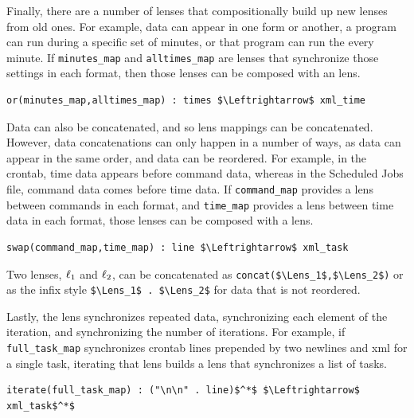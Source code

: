 \documentclass[acmsmall,screen,anonymous]{acmart}
\begin{document}
Finally, there are a number of lenses that compositionally build up new lenses
from old ones. For example, data can appear in one form or another, a program
can run during a specific set of minutes, or that program can run the every
minute. If \lstinline{minutes_map} and \lstinline{alltimes_map} are lenses that
synchronize those settings in each format, then those lenses can be composed
with an \OrLens lens.
%
\begin{lstlisting}
or(minutes_map,alltimes_map) : times $\Leftrightarrow$ xml_time
\end{lstlisting}

Data can also be concatenated, and so lens mappings can be concatenated.
However, data concatenations can only happen in a number of ways, as data can
appear in the same order, and data can be reordered. For example, in the
crontab, time data appears before command data, whereas in the Scheduled Jobs
file, command data comes before time data. If \lstinline{command_map} provides a
lens between commands in each format, and \lstinline{time_map} provides a lens
between time data in each format, those lenses can be composed with a \SwapLens
lens.
%
\begin{lstlisting}
swap(command_map,time_map) : line $\Leftrightarrow$ xml_task
\end{lstlisting}
%
Two lenses, $\mathit{\ell}_1$ and $\mathit{\ell}_2$, can be concatenated as
\lstinline{concat($\Lens_1$,$\Lens_2$)} or as the infix style
\lstinline{$\Lens_1$ . $\Lens_2$} for data that is not reordered.

Lastly, the \IterateLens lens synchronizes repeated data, synchronizing each
element of the iteration, and synchronizing the number of iterations. For
example, if \lstinline{full_task_map} synchronizes crontab lines prepended by
two newlines and xml for a single task, iterating that lens builds a lens that
synchronizes a list of tasks.
%
\begin{lstlisting}
iterate(full_task_map) : ("\n\n" . line)$^*$ $\Leftrightarrow$ xml_task$^*$
\end{lstlisting}
%
\end{document}

